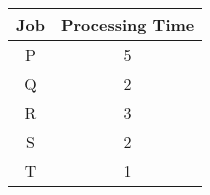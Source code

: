 \begin{table}[ht]
\centering
\begin{tabular}{|c|c|}
\hline
\textbf{Job} & \textbf{Processing Time} \\ \hline
P            & 5                        \\ \hline
Q            & 2                        \\ \hline
R            & 3                        \\ \hline
S            & 2                        \\ \hline
T            & 1                        \\ \hline
\end{tabular}
\end{table}

